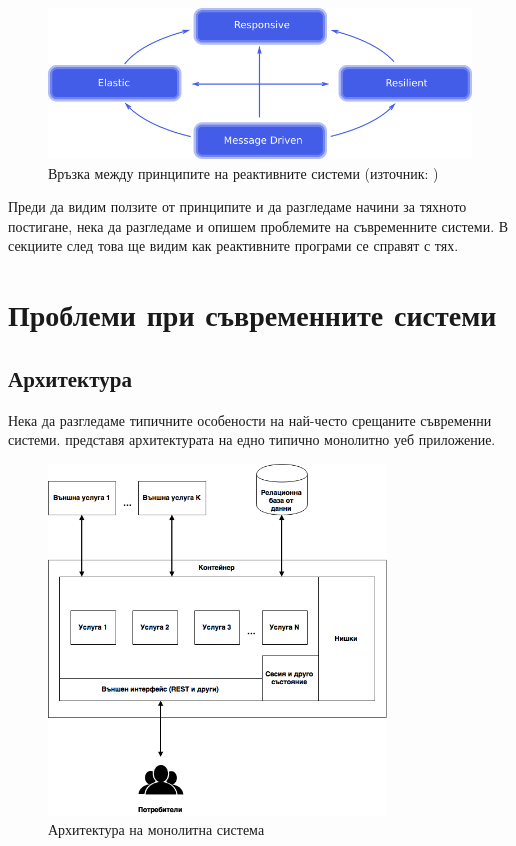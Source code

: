 \begin{figure}
  \includegraphics[width=\textwidth]{images/reactive-traits.png}
  \caption[Връзка между принципите на реактивните системи]{Връзка между принципите на реактивните системи (източник: \cite{reactiveManifesto})}
  \label{fig:reactive-trats}
\end{figure}

Преди да видим ползите от принципите и да разгледаме начини за тяхното постигане, нека да разгледаме и опишем проблемите на съвременните системи. В секциите след това ще видим как реактивните програми се справят с тях.

\section{Проблеми при съвременните системи}

\subsection{Архитектура}

Нека да разгледаме типичните особености на най-често срещаните съвременни системи.  представя архитектурата на едно типично монолитно уеб приложение.

\begin{figure}[th]
  \centering\includegraphics[width=0.8\textwidth]{images/monolithic-architecture.png}
  \caption{Архитектура на монолитна система}
  \label{fig:monolithic-architecture}
\end{figure}

